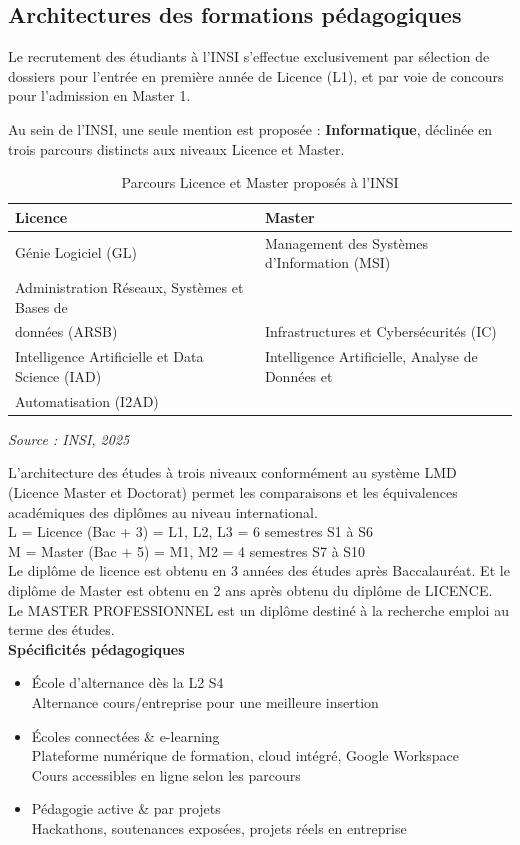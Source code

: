 \documentclass[a4paper,12pt, oneside]{article}
\begin{document}
\subsection{Architectures des formations pédagogiques}

Le recrutement des étudiants à l’INSI s’effectue exclusivement par sélection de dossiers pour l’entrée en première année de Licence (L1), et par voie de concours pour l’admission en Master 1.

Au sein de l’INSI, une seule mention est proposée : \textbf{Informatique}, déclinée en trois parcours distincts aux niveaux Licence et Master.


\begin{table}[H]
\centering
\begin{tabular}{|l|l|}
\hline
\textbf{Licence} & \textbf{Master} \\
\hline
Génie Logiciel (GL) & Management des Systèmes d’Information (MSI) \\
\hline
Administration Réseaux, Systèmes et Bases de \\données (ARSB) & Infrastructures et Cybersécurités (IC) \\
\hline
Intelligence Artificielle et Data Science (IAD) & Intelligence Artificielle, Analyse de Données et \\Automatisation (I2AD) \\
\hline
\end{tabular}
\caption{Parcours Licence et Master proposés à l’INSI}
\textit{Source : INSI, 2025}
\label{tab:parcours}
\end{table} 

L’architecture des études à trois niveaux conformément au système LMD (Licence Master et Doctorat) permet les comparaisons et les équivalences académiques des diplômes au niveau international.\\
L = Licence (Bac + 3) = L1, L2, L3 = 6 semestres S1 à S6\\
M = Master (Bac + 5) = M1, M2 = 4 semestres S7 à S10\\
Le diplôme de licence est obtenu en 3 années des études après Baccalauréat. Et le diplôme de Master est obtenu en 2 ans après obtenu du diplôme de LICENCE.\\
Le MASTER PROFESSIONNEL est un diplôme destiné à la recherche emploi au terme des études.\\

\textbf{Spécificités pédagogiques} 
\begin{itemize}
    \item École d'alternance dès la L2 S4\\
    Alternance cours/entreprise pour une meilleure insertion
    \item Écoles connectées \& e-learning\\
    Plateforme numérique de formation, cloud intégré, Google Workspace\\
    Cours accessibles en ligne selon les parcours
    \item Pédagogie active \& par projets\\
    Hackathons, soutenances exposées, projets réels en entreprise
\end{itemize}
\end{document}
